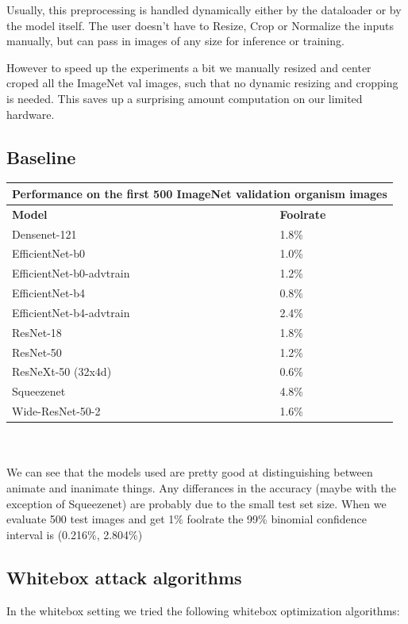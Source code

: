 Usually, this preprocessing is handled dynamically either by the dataloader or by the model itself. The user doesn't have to Resize, Crop or Normalize the inputs manually, but can pass in images of any size for inference or training.

However to speed up the experiments a bit we manually resized and center croped all the ImageNet val images, such that no dynamic resizing and cropping is needed. This saves up a surprising amount computation on our limited hardware.


\subsection{Baseline}
\begin{tabular}{ ||p{5cm}|p{3cm}|| }
  \hline
     \multicolumn{2}{|c|}{Performance on the first 500 ImageNet validation organism images} \\
 \hline
 \textbf{Model} & \textbf{Foolrate} \\
 \hline
 \hline
 Densenet-121 & 1.8\%  \\
 \hline
 EfficientNet-b0 & 1.0\% \\
 \hline
 EfficientNet-b0-advtrain & 1.2\% \\
 \hline
 EfficientNet-b4 & 0.8\% \\
 \hline
 EfficientNet-b4-advtrain & 2.4\% \\
 \hline
 ResNet-18 & 1.8\% \\
 \hline
 ResNet-50 & 1.2\% \\
 \hline
 ResNeXt-50 (32x4d) & 0.6\% \\
 \hline
 Squeezenet & 4.8\% \\
 \hline
 Wide-ResNet-50-2 & 1.6\% \\
 \hline
\end{tabular} \\ \\

We can see that the models used are pretty good at distinguishing between animate and inanimate things. Any differances in the accuracy (maybe with the exception of Squeezenet) are probably due to the small test set size. When we evaluate 500 test images and get 1\% foolrate the 99\% binomial confidence interval is (0.216\%, 2.804\%)

\subsection{Whitebox attack algorithms}
In the whitebox setting we tried the following whitebox optimization algorithms:

